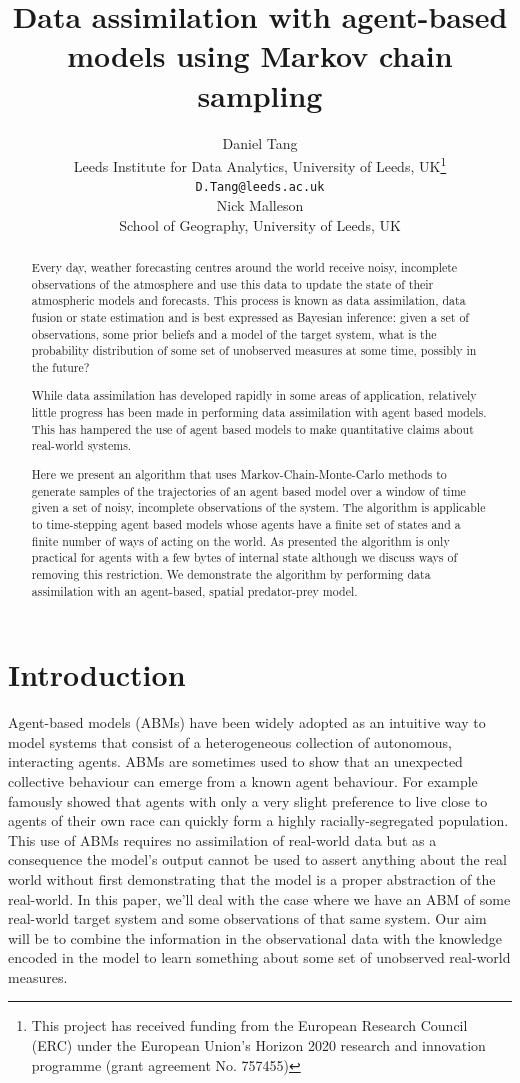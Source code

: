 \documentclass{article}
\title{Data assimilation with agent-based models using Markov chain sampling}
\author{
  Daniel Tang\\
    Leeds Institute for Data Analytics, University of Leeds, UK\thanks{This project has received funding from the European Research Council (ERC) under the European Union’s Horizon 2020 research and innovation programme (grant agreement No. 757455)}\\
  \texttt{D.Tang@leeds.ac.uk}\\
  \AND
  Nick Malleson\\
  School of Geography, University of Leeds, UK\\  
}
\begin{document}
\maketitle

\begin{abstract}
Every day, weather forecasting centres around the world receive noisy, incomplete observations of the atmosphere and use this data to update the state of their atmospheric models and forecasts. This process is known as data assimilation, data fusion or state estimation and is best expressed as Bayesian inference: given a set of observations, some prior beliefs and a model of the target system, what is the probability distribution of some set of unobserved measures at some time, possibly in the future?

While data assimilation has developed rapidly in some areas of application, relatively little progress has been made in performing data assimilation with agent based models. This has hampered the use of agent based models to make quantitative claims about real-world systems.

Here we present an algorithm that uses Markov-Chain-Monte-Carlo methods to generate samples of the trajectories of an agent based model over a window of time given a set of noisy, incomplete observations of the system. The algorithm is applicable to time-stepping agent based models whose agents have a finite set of states and a finite number of ways of acting on the world. As presented the algorithm is only practical for agents with a few bytes of internal state although we discuss ways of removing this restriction. We demonstrate the algorithm by performing data assimilation with an agent-based, spatial predator-prey model.
\end{abstract}


\section{Introduction}

Agent-based models (ABMs) have been widely adopted as an intuitive way to model systems that consist of a heterogeneous collection of autonomous, interacting agents. ABMs are sometimes used to show that an unexpected collective behaviour can emerge from a known agent behaviour.  For example \citet{schelling1971dynamic} famously showed that agents with only a very slight preference to live close to agents of their own race can quickly form a highly racially-segregated population. This use of ABMs requires no assimilation of real-world data but as a consequence the model's output cannot be used to assert anything about the real world without first demonstrating that the model is a proper abstraction of the real-world. In this paper, we'll deal with the case where we have an ABM of some real-world target system and some observations of that same system. Our aim will be to combine the information in the observational data with the knowledge encoded in the model to learn something about some set of unobserved real-world measures.
\end{document}
